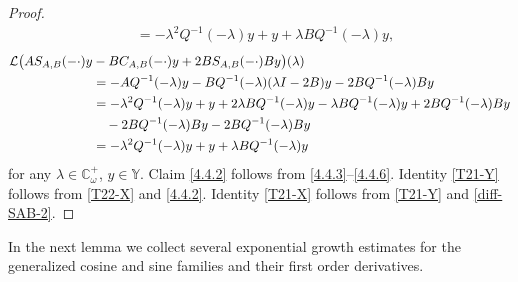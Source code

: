 \documentclass[11pt]{amsart}
\numberwithin{equation}{section}
\newcommand{\SAB}{S_{A,B}}
\theoremstyle{remark}
\theoremstyle{definition}
\newcommand\bY{{\mathbb Y}}
\begin{document}
\begin{proof}
\begin{align}
		&= -\lambda^2 Q^{-1}(-\lambda)y + y + \lambda BQ^{-1}(-\lambda)y, 
	\end{align}
	\begin{align}\label{4.4.6}
		\mathcal{L}\big(A\SAB(-\cdot)y &- BC_{A,B}(-\cdot)y + 2B\SAB(-\cdot)By\big)(\lambda)\notag\\
		&= -AQ^{-1}(-\lambda)y - BQ^{-1}(-\lambda)(\lambda I-2B)y - 2BQ^{-1}(-\lambda)By \notag\\
		&= -\lambda^2 Q^{-1}(-\lambda)y + y + 2\lambda BQ^{-1}(-\lambda)y
		- \lambda BQ^{-1}(-\lambda)y + 2BQ^{-1}(-\lambda)By \notag\\
		&\quad - 2BQ^{-1}(-\lambda)By
		- 2BQ^{-1}(-\lambda)By \notag\\
		&= -\lambda^2 Q^{-1}(-\lambda)y + y + \lambda BQ^{-1}(-\lambda)y 
	\end{align}
	for any $\lambda \in \mathbb{C}_\omega^+$, $y \in \bY$. Claim \eqref{4.4.2} follows from \eqref{4.4.3}--\eqref{4.4.6}. Identity \eqref{T21-Y} follows from \eqref{T22-X} and \eqref{4.4.2}. Identity \eqref{T21-X} follows from \eqref{T21-Y} and \eqref{diff-SAB-2}.
\end{proof}	
In the next lemma we collect several exponential growth estimates for the generalized cosine and sine families and their first order derivatives. 
\end{document}
